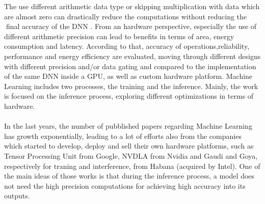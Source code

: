 The use different arithmetic data type or skipping multiplication with data which are almost zero can drastically reduce the computations without reducing the final accuracy of the DNN \cite{paper:7}\cite{paper:8} . From an hardware perspective, especially the use of different arithmetic precision\cite{paper:14} can lead to benefits in terms of area, energy consumption and latency.\newline
According to that, accuracy of operations,reliability, performance and energy efficiency are evaluated, moving through different designs with different precision and/or data gating and compared to the implementation of the same
DNN inside a GPU, as well as custom hardware platform.
\newpage 
Machine Learning includes two processes, the training and the inference. Mainly, the work is focused on the inference process, exploring different optimizations in terms of hardware.\\\\
In the last years, the number of pubblished papers regarding Machine Learning has growth exponentially, leading to a lot of efforts also from the companies which started to develop, deploy and sell their own hardware platforms, such as Tensor Processing Unit from Google, NVDLA from Nvidia and Gaudi and Goya, respectively for traning and interference, from Habana (acquired by Intel). \newline
One of the main ideas of those works is that during the inference process, a model does not need the high precision computations \cite{paper:8} \cite{paper:15}for achieving high accuracy into its outputs.\\ 




